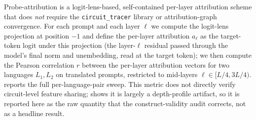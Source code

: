 Probe-attribution is a logit-lens-based, self-contained per-layer attribution scheme that
does \emph{not} require the \texttt{circuit\_tracer} library or attribution-graph
convergence. For each prompt and each layer $\ell$ we compute the logit-lens projection at
position $-1$ and define the per-layer attribution $a_\ell$ as the target-token logit under
this projection (the layer-$\ell$ residual passed through the model's final norm and
unembedding, read at the target token); we then compute the Pearson correlation $r$
between the per-layer attribution vectors for two languages $L_1,L_2$ on translated prompts,
restricted to mid-layers $\ell\in[L/4,3L/4)$.  reports the full
per-language-pair sweep. This metric does not directly verify circuit-level feature sharing;
 shows it is largely a depth-profile artifact, so it is
reported here as the raw quantity that the construct-validity audit corrects, not as a
headline result.

